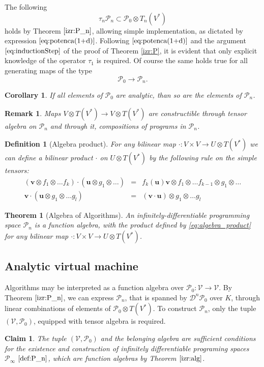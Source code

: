 \documentclass{article}
\newcommand{\VV}{\mathcal{V}}
\newcommand{\uu}{\mathbf{u}}
\newcommand{\vv}{\mathbf{v}}
\newcommand{\dP}{\mathcal{P}}
\newcommand{\DD}{\mathcal{D}}
\newcommand{\sumd}{\tau}
\newtheorem{definicija}{Definition}[section]
\newtheorem{trditev}{Claim}[section]
\newtheorem{izrek}{Theorem}[section]
\newtheorem{opomba}{Remark}[section]
\newtheorem{corollary}{Corollary}[section]
\begin{document}
    The following
     \begin{equation}
     	\sumd_n\dP_n\subset\dP_0\otimes T_n(V^*)
     \end{equation}
   	holds by Theorem $\ref{izr:P_n}$, allowing simple implementation, as dictated by expression $\eqref{eq:potenca(1+d)}$. Following $\eqref{eq:potenca(1+d)}$ and the argument $\eqref{eq:inductionStep}$ of the proof of Theorem \ref{izr:P}, it is evident that only explicit knowledge of the operator $\sumd_1$ is required.
        Of course the same holds true for all generating maps of the type
        $$\dP_0\to\dP_n.$$
 \begin{corollary}
   If all elements of $\dP_0$ are analytic, than so are the elements of $\dP_n$.
   \end{corollary}        
        
       \begin{opomba}\label{rem:vTen}
       Maps $V\otimes T(V^*)\to V\otimes T(V^*)$ are constructible through tensor algebra on $\dP_n$ and through it, compositions of programs in $\dP_n$.
       \end{opomba}
       
 

\begin{definicija}[Algebra product]
 For any bilinear map $\cdot :V\times V\to U\otimes T(V^*)$ we can define a
 bilinear product $\cdot$ on $U\otimes T(V^*)$ by the following rule on the simple
 tensors:
 \begin{eqnarray}
   \label{eq:algebra_product}
   (\vv\otimes f_1\otimes\ldots f_k) \cdot (\uu\otimes g_1\otimes\ldots) &=& 
f_k(\uu)\vv\otimes f_1\otimes\ldots f_{k-1}\otimes g_1\otimes\ldots \\
   \vv\cdot (\uu\otimes g_1\otimes\ldots g_l) &=&  (\vv\cdot \uu)\otimes
    \nonumber                                              g_1\otimes\ldots g_l
 \end{eqnarray}
\end{definicija}
\begin{izrek}[Algebra of Algorithms]\label{izr:alg}
An infinitely-differentiable programming space $\dP_n$ is a function algebra,
with the product defined by \eqref{eq:algebra_product} for any bilinear map $\cdot :V\times V\to U\otimes T(V^*)$.
\end{izrek}

\subsection{Analytic virtual machine}
Algorithms may be interpreted as a function algebra over $\dP_0:\VV\to \VV$.
By Theorem $\ref{izr:P_n}$, we can express $\dP_n$, that is spanned by $\DD^n\dP_0$ over $K$, through linear combinations of elements of $\dP_0\otimes T(V^*)$. To construct $\dP_n$, only the tuple $(\VV,\dP_0)$, equipped with tensor algebra is required.
\begin{trditev}
The tuple  $(\VV,\dP_0)$ and the belonging algebra are sufficient conditions for the existence and construction of infinitely differentiable programing spaces $\dP_\infty$ $\eqref{def:P_n}$, which are function algebras by Theorem $\ref{izr:alg}$.
\end{trditev}
\end{document}
